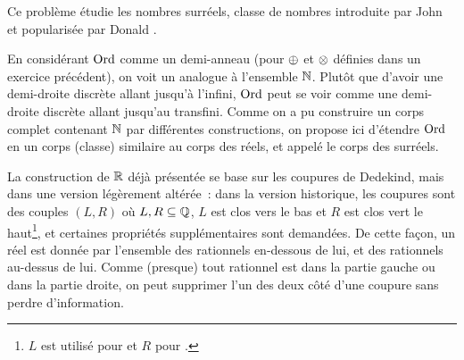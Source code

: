 \begin{problem}
  Ce problème étudie les nombres surréels, classe de nombres introduite par
  John  \cite{Conway1976} et popularisée par Donald 
  \cite{Knuth1974}.


  En considérant $\operatorname{Ord}$ comme un demi-anneau (pour $\mathbin{\oplus}$ et $\mathbin{\otimes}$ définies
  dans un exercice précédent), on voit un analogue à l'ensemble
  $\mathbb N$. Plutôt que d'avoir une demi-droite discrète allant jusqu'à l'infini,
  $\operatorname{Ord}$ peut se voir comme une demi-droite discrète allant jusqu'au transfini.
  Comme on a pu construire un corps complet contenant $\mathbb N$ par différentes
  constructions, on propose ici d'étendre $\operatorname{Ord}$ en un corps (classe) similaire
  au corps des réels, et appelé le corps des surréels.

  La construction de $\mathbb R$ déjà présentée se base sur les coupures de Dedekind,
  mais dans une version légèrement altérée~: dans la version historique, les
  coupures sont des couples $(L,R)$ où $L,R\subseteq\mathbb Q$, $L$ est clos vers le
  bas et $R$ est clos vert le haut\footnote{$L$ est utilisé pour
   et $R$ pour .}, et certaines propriétés
  supplémentaires sont demandées. De cette façon, un réel est donnée par
  l'ensemble des rationnels en-dessous de lui, et des rationnels au-dessus de
  lui. Comme (presque) tout rationnel est dans la partie gauche ou dans la
  partie droite, on peut supprimer l'un des deux côté d'une coupure sans perdre
  d'information.


\end{problem}
